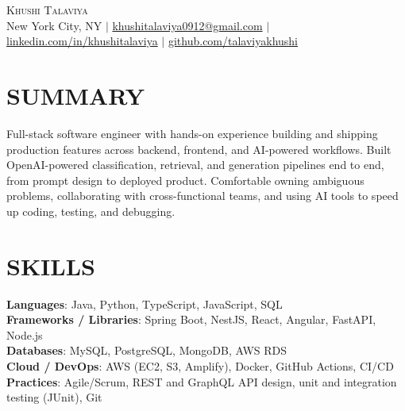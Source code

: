 \documentclass[letterpaper,11pt]{article}
\begin{document}
\begin{center}
    {\Huge \scshape Khushi Talaviya} \\ \vspace{2pt}
    \vspace{4pt}
    \small
    New York City, NY $|$
    \href{mailto:khushitalaviya0912@gmail.com}{khushitalaviya0912@gmail.com} $|$
    \href{https://www.linkedin.com/in/khushitalaviya/}{linkedin.com/in/khushitalaviya} $|$
    \href{https://github.com/talaviyakhushi}{github.com/talaviyakhushi}
\end{center}

\section{SUMMARY}
\vspace{5pt}
\small{Full-stack software engineer with hands-on experience building and shipping production features across backend, frontend, and AI-powered workflows. Built OpenAI-powered classification, retrieval, and generation pipelines end to end, from prompt design to deployed product. Comfortable owning ambiguous problems, collaborating with cross-functional teams, and using AI tools to speed up coding, testing, and debugging.}

\vspace{2pt}
\section{SKILLS}
\vspace{5pt}
\begin{itemize}[leftmargin=0in, label={}]
\small{\item{
\textbf{Languages}{: Java, Python, TypeScript, JavaScript, SQL} \\
\textbf{Frameworks / Libraries}{: Spring Boot, NestJS, React, Angular, FastAPI, Node.js} \\
\textbf{Databases}{: MySQL, PostgreSQL, MongoDB, AWS RDS} \\
\textbf{Cloud / DevOps}{: AWS (EC2, S3, Amplify), Docker, GitHub Actions, CI/CD} \\
\textbf{Practices}{: Agile/Scrum, REST and GraphQL API design, unit and integration testing (JUnit), Git}
}}
\end{itemize}
\vspace{-10pt}

\end{document}
